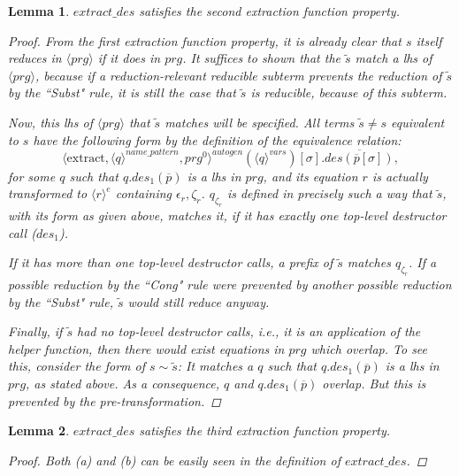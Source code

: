 \documentclass[11pt]{article} %
\newtheorem*{lemma*}{Lemma}
\begin{document}
\begin{lemma*}

$extract\_des$ satisfies the second extraction function property.

\begin{proof}

From the first extraction function property, it is already clear that $s$ itself reduces in $\langle prg \rangle$ if it does in $prg$. It suffices to shown that the $\widetilde{s}$ match a lhs of $\langle prg \rangle$, because if a reduction-relevant reducible subterm prevents the reduction of $\widetilde{s}$ by the ``Subst" rule, it is still the case that $\widetilde{s}$ is reducible, because of this subterm.

Now, this lhs of $\langle prg \rangle$ that $\widetilde{s}$ matches will be specified. All terms $\widetilde{s} \neq s$ equivalent to $s$ have the following form by the definition of the equivalence relation:
\begin{equation*}
\langle \textrm{extract}, \langle q \rangle^{name\_pattern}, prg^0 \rangle^{autogen}(\langle q \rangle^{vars})[\sigma].\overline{des(\overline{p}[\sigma])},
\end{equation*}
for some $q$ such that $q.des_1(\overline{p})$ is a lhs in $prg$, and its equation $r$ is actually transformed to $\langle r \rangle^e$ containing $\epsilon_r, \zeta_r$. $q_{\zeta_r}$ is defined in precisely such a way that $\widetilde{s}$, with its form as given above, matches it, if it has exactly one top-level destructor call ($des_1$).

If it has more than one top-level destructor calls, a prefix of $\widetilde{s}$ matches $q_{\zeta_r}$. If a  possible reduction by the ``Cong" rule were prevented by another possible reduction by the ``Subst" rule, $\widetilde{s}$ would still reduce anyway.

Finally, if $\widetilde{s}$ had no top-level destructor calls, i.e., it is an application of the helper function, then there would exist equations in $prg$ which overlap. To see this, consider the form of $s \sim \widetilde{s}$: It matches a $q$ such that $q.des_1(\overline{p})$ is a lhs in $prg$, as stated above. As a consequence, $q$ and $q.des_1(\overline{p})$ overlap. But this is prevented by the pre-transformation.

\end{proof}

\end{lemma*}

\begin{lemma*}

$extract\_des$ satisfies the third extraction function property.

\begin{proof}

Both (a) and (b) can be easily seen in the definition of $extract\_des$.

\end{proof}

\end{lemma*}
\end{document}
